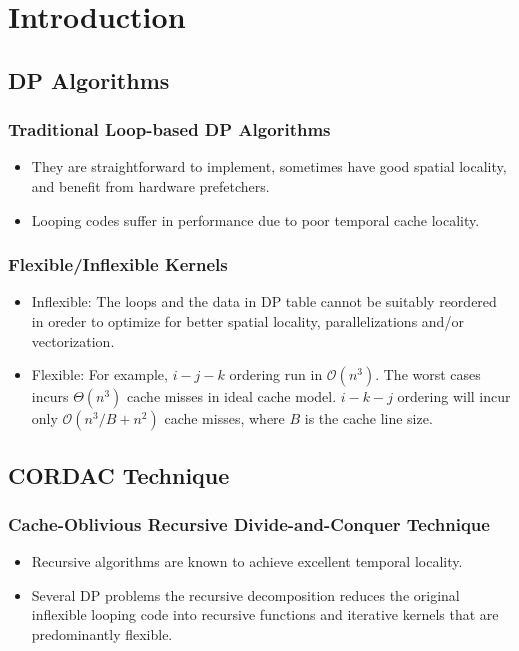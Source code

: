 \section{Introduction}

\subsection{DP Algorithms}
\begin{frame}
    \frametitle{Traditional Loop-based DP Algorithms}
	\begin{itemize}
		\item They are straightforward to implement, 
			sometimes have good spatial locality, and benefit from hardware
			prefetchers.
		\item Looping codes suffer in performance due to poor temporal cache
			locality.
	\end{itemize}
\end{frame}

\begin{frame}
    \frametitle{Flexible/Inflexible Kernels}
	\begin{itemize}
		\item Inflexible: The loops and the data in DP table cannot be suitably
			reordered in oreder to optimize for better spatial locality,
			parallelizations and/or vectorization.
		\item Flexible: For example, $i-j-k$ ordering run in $\mathcal{O}(n^3)$.
			The worst cases incurs $\Theta(n^3)$ cache misses in ideal cache model.
			$i-k-j$ ordering will incur only $\mathcal{O}(n^3/B + n^2)$ cache misses,
			where $B$ is the cache line size.
	\end{itemize}
\end{frame}

\subsection{CORDAC Technique}
\begin{frame}
    \frametitle{Cache-Oblivious Recursive Divide-and-Conquer Technique}
	\begin{itemize}
		\item Recursive algorithms are known to achieve excellent temporal locality.
		\item Several DP problems the recursive decomposition reduces the original 
			inflexible looping code into recursive functions and iterative kernels 
			that are predominantly flexible.
	\end{itemize}
\end{frame}

